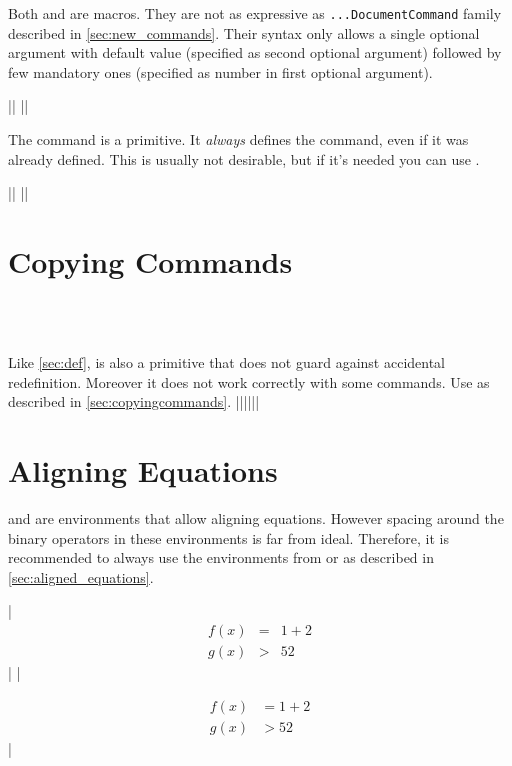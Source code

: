 Both  and  are  macros. They
are not as expressive as \texttt{...DocumentCommand} family
described in \autoref{sec:new_commands}. Their syntax only allows a single
optional argument with default value (specified as second optional argument)
followed by few mandatory ones (specified as number in first optional
argument).
\begin{chktexignore}
  \vchto|\newcommand{\foo}[4][bar]{ ... }|%
  ||
\end{chktexignore}

The  command is a  primitive. It \emph{always} defines
the command, even if it was already defined. This is usually not desirable, but
if it's needed you can use .
\begin{chktexignore}
  \vchto|\def\foo#1#2#3{ ... }|
  ||
\end{chktexignore}

\section{Copying Commands}
 {
   \\
   \\
}

Like \autoref{sec:def},  is also a  primitive that
does not guard against accidental redefinition. Moreover it does not work
correctly with some  commands. Use  as
described in \autoref{sec:copyingcommands}.
\chto|\let\foo\bar||\NewCommandCopy\foo\bar|

\section{Aligning Equations}

 and  are  environments that allow
aligning equations. However spacing around the binary operators in these environments is far
from ideal. Therefore, it is recommended to always use the  environments
from  or  as described in
\autoref{sec:aligned_equations}.
\begin{chktexignore}
\chto
|\begin{eqnarray}
  f(x) & = &  1 + 2 \\
  g(x) & > & 52
\end{eqnarray}|
|\usepackage{amsmath}
\begin{align}
  f(x) & = 1 + 2 \\
  g(x) & > 52
\end{align}|
\end{chktexignore}


